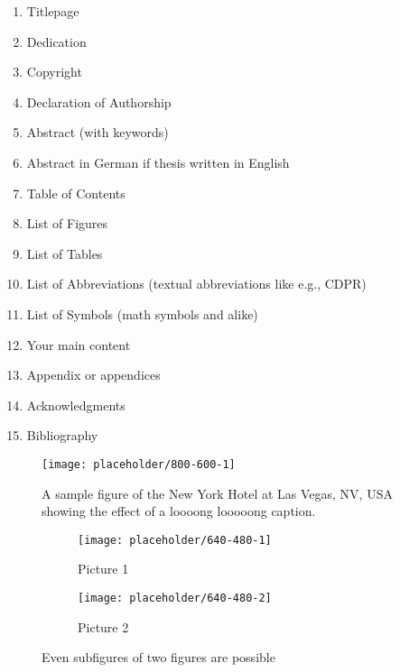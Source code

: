 \begin{enumerate}
    \item Titlepage
    \item Dedication
    \item Copyright
    \item Declaration of Authorship
    \item Abstract (with keywords)
    \item Abstract in German if thesis written in English
    \item Table of Contents
    \item List of Figures
    \item List of Tables
    \item List of Abbreviations (textual abbreviations like e.g., CDPR)
    \item List of Symbols (math symbols and alike)
    \item Your main content
    \item Appendix or appendices
    \item Acknowledgments
    \item Bibliography
\end{enumerate}

\begin{figure}
    \centering
    \texttt{[image: placeholder/800-600-1]}
    \caption{A sample figure of the New York Hotel at Las Vegas, NV, USA showing the effect of a loooong looooong caption.}
    \label{fig:sample-figure}
\end{figure}

\begin{figure}
    \centering
    \begin{subfigure}[b]{0.49\textwidth}
        \texttt{[image: placeholder/640-480-1]}
        \caption{Picture 1}
        \label{fig:subfigures-two:1}
    \end{subfigure}
    \hfill
    \begin{subfigure}[b]{0.49\textwidth}
        \texttt{[image: placeholder/640-480-2]}
        \caption{Picture 2}
        \label{fig:subfigures-two:2}
    \end{subfigure}
    
    \caption{Even subfigures of two figures are possible}
    \label{fig:subfigures-two}
\end{figure}

